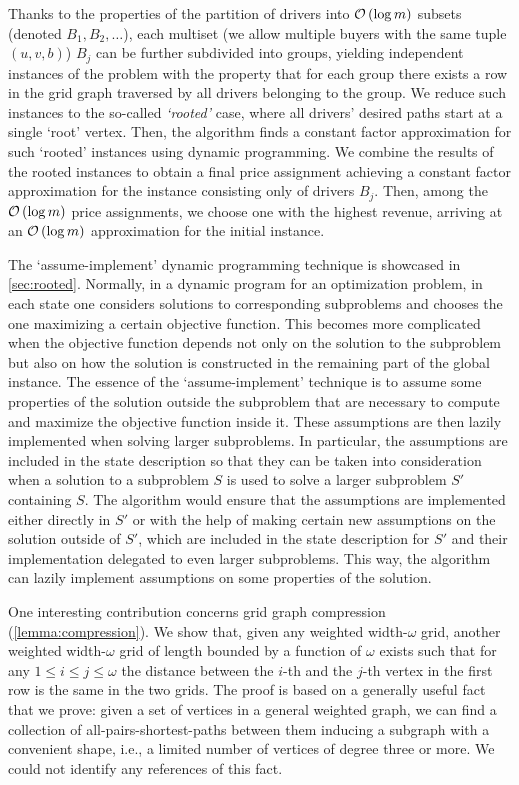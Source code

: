 Thanks to the properties of the partition of drivers into $\mathcal{O} \left( \log m \right)$ subsets (denoted $B_1, B_2, \ldots$), each multiset (we allow multiple buyers with the same tuple $(u, v, b)$) $B_j$ can be further subdivided into groups, yielding independent instances of the problem
with the property that for each group there exists a row in the grid graph traversed by all drivers belonging to the group.
We reduce such instances to the so-called \emph{`rooted'} case, where all drivers' desired paths start at a single `root' vertex.
Then, the algorithm finds a constant factor approximation for such `rooted' instances using dynamic programming.
We combine the results of the rooted instances to obtain a final price assignment achieving a constant factor approximation for the instance consisting only of drivers $B_j$.
Then, among the $\mathcal{O} \left( \log m \right)$ price assignments, we choose one with the highest revenue, arriving at an $\mathcal{O} \left( \log m \right)$ approximation for the initial instance.

The `assume-implement' dynamic programming technique is showcased in \cref{sec:rooted}.
Normally, in a dynamic program for an optimization problem, in each state one considers
solutions to corresponding subproblems and chooses the one maximizing a certain objective function.
This becomes more complicated when the objective function depends not only on the solution to the subproblem
but also on how the solution is constructed in the remaining part of the global instance.
The essence of the `assume-implement' technique is to assume some properties of the solution
outside the subproblem that are necessary to compute and maximize the objective function inside it. These assumptions are then lazily implemented when solving larger subproblems. In particular, the assumptions are included in the state description so that they can be taken into consideration when a solution to a subproblem $S$ is used to solve a larger subproblem $S'$ containing $S$. The algorithm would ensure that the assumptions are implemented either directly in $S'$ or
with the help of making certain new assumptions on the solution outside of $S'$, which are included in the state description for $S'$ and their implementation delegated to even larger subproblems.
This way, the algorithm can lazily implement assumptions on some properties of the solution.

One interesting contribution concerns grid graph compression (\cref{lemma:compression}). We show that, given any weighted width-$\omega$ grid, another weighted width-$\omega$ grid of length bounded by a function of $\omega$ exists such that for any $1 \leq i \leq j \leq \omega$ the distance between the $i$-th and the $j$-th vertex in the first row is the same in the two grids.
The proof is based on a generally useful fact that we prove: given a set of vertices in a general weighted graph, we can find a collection of all-pairs-shortest-paths between them inducing a subgraph with a convenient shape, i.e., a limited number of vertices of degree three or more. We could not identify any references of this fact.
